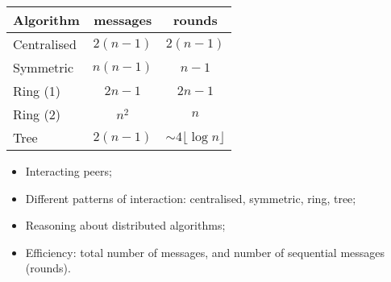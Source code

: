 \documentclass[notes,color]{sepslide0}
\begin{document}

\begin{slide}

\begin{tabular}{lcc}
Algorithm & messages & rounds \\
\hline
Centralised & $2(n-1)$ & $2(n-1)$ \\
Symmetric & $n(n-1)$ & $n-1$ \\
Ring (1) & $2n-1$ & $2n-1$ \\
Ring (2) & $n^2$ & $n$ \\
Tree & $2(n-1)$ & $\sim 4\lfloor \log n \rfloor$
\end{tabular}
\end{slide}


\begin{slide}

\begin{itemize}
\item
Interacting peers;

\item
Different patterns of interaction: centralised, symmetric, ring, tree;

\item
Reasoning about distributed algorithms;

\item
Efficiency: total number of messages, and number of sequential messages
(rounds).
\end{itemize}
\end{slide}
\end{document}
